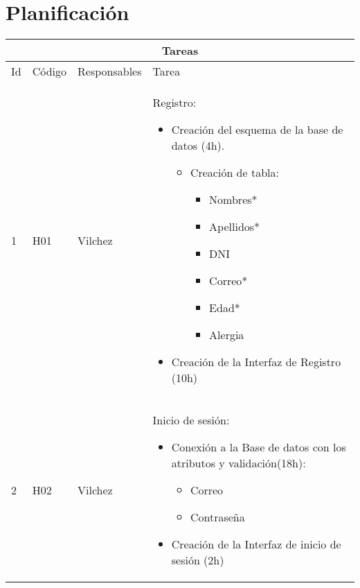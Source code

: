 
\chapter{Planificación}

\begin{table}[htb]
\centering
\begin{tabular}{|l|p{1.5cm}|p{2.3cm}|p{10cm}|}
	\hline
	\multicolumn{4}{|c|}{Tareas} \\ \hline
	Id & Código & Responsables & Tarea \\
	\hline \hline
	1 & H01 & Vilchez & Registro:\begin{itemize}
		\item Creación del esquema de la base de datos (4h).
			\begin{itemize}
			\item Creación de tabla:
			 		\begin{itemize}
			 		\item Nombres*
			 		\item Apellidos*
			 		\item DNI
			 		\item Correo*
			 		\item Edad*
			 		\item Alergia		 	 
			 	\end{itemize}
			\end{itemize}
		\item Creación de la Interfaz de Registro (10h)		
	\end{itemize}\\ \hline
	
	2 & H02 & Vilchez & Inicio de sesión: \begin{itemize}
		\item Conexión a la Base de datos con los atributos y validación(18h):							
			\begin{itemize}						
				\item Correo
				\item Contraseña	 	 				
			\end{itemize}
		
		\item Creación de la Interfaz de inicio de sesión (2h) 
		\end{itemize}\\ \hline	
\end{tabular}

\end{table}
